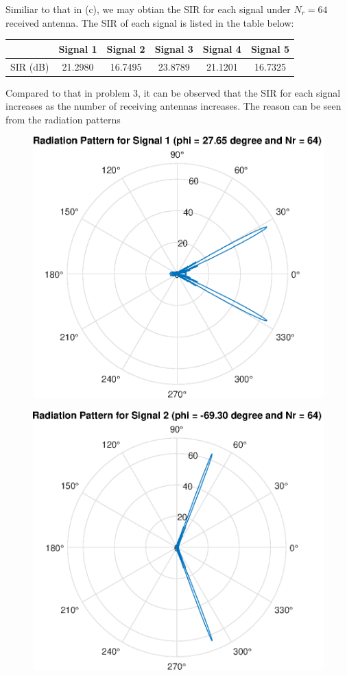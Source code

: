 Similiar to that in (c), we may obtian the SIR for each signal under $N_r = 64$ received antenna.
The SIR of each signal is listed in the table below:
\begin{table}[H]
    \centering
    \begin{tabular}{c|c|c|c|c|c}
        & Signal 1 & Signal 2 & Signal 3 & Signal 4 & Signal 5 \\  
             \hline 
    SIR (dB) & 21.2980  & 16.7495  & 23.8789  & 21.1201  & 16.7325  
    \end{tabular}
\end{table}
Compared to that in problem 3, it can be observed that the SIR for 
each signal increases as the number of receiving antennas increases.
The reason can be seen from the radiation patterns
\begin{figure}[H]
    \centering
    \includegraphics[scale = 0.7]{N64_1.eps}
\end{figure}
\begin{figure}[H]
    \centering
    \includegraphics[scale = 0.7]{N64_2.eps}
\end{figure}
